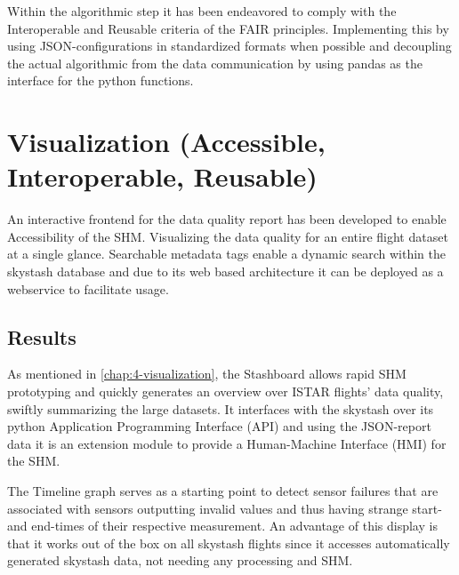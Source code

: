 Within the algorithmic step it has been endeavored to comply with the Interoperable and Reusable criteria of the FAIR principles. Implementing this by using JSON-configurations in standardized formats when possible and decoupling the actual algorithmic from the data communication by using pandas as the interface for the python functions.

%

\section{Visualization (Accessible, Interoperable, Reusable)}
An interactive frontend for the data quality report has been developed to enable Accessibility of the SHM. Visualizing the data quality for an entire flight dataset at a single glance. Searchable metadata tags enable a dynamic search within the skystash database and due to its web based architecture it can be deployed as a webservice to facilitate usage.

\subsection{Results}
As mentioned in \ref{chap:4-visualization}, the Stashboard allows rapid SHM prototyping and quickly generates an overview over ISTAR flights' data quality, swiftly summarizing the large datasets. It interfaces with the skystash over its python Application Programming Interface (API) and using the JSON-report data it is an extension module to provide a Human-Machine Interface (HMI) for the SHM.

The Timeline graph serves as a starting point to detect sensor failures that are associated with sensors outputting invalid values and thus having strange start- and end-times of their respective measurement. An advantage of this display is that it works out of the box on all skystash flights  since it accesses automatically generated skystash data, not needing any processing and SHM.

